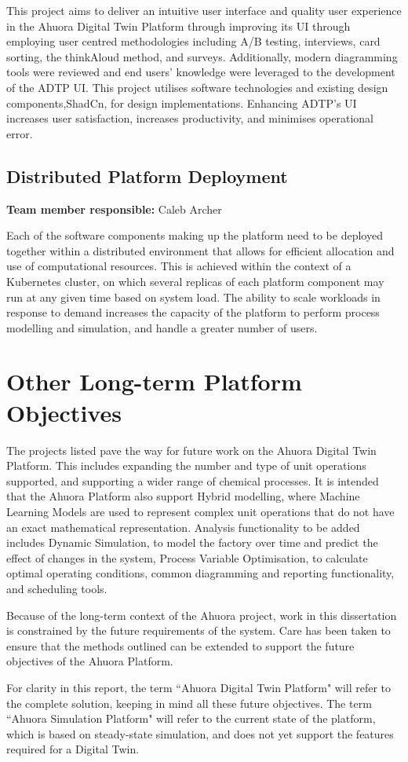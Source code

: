 This project aims to deliver an intuitive user interface and quality user experience in the Ahuora Digital Twin Platform through improving its UI through employing user centred methodologies including A/B testing, interviews, card sorting, the thinkAloud method, and surveys. Additionally, modern diagramming tools were reviewed and end users' knowledge were leveraged to the development of the ADTP UI. This project utilises software technologies and existing design components,ShadCn, for design implementations. Enhancing ADTP's UI increases user satisfaction, increases productivity, and minimises operational error.  

\subsection{Distributed Platform Deployment}

\textbf{Team member responsible:} Caleb Archer

Each of the software components making up the platform need to be deployed together within a distributed environment that allows for efficient allocation and use of computational resources. This is achieved within the context of a Kubernetes cluster, on which several replicas of each platform component may run at any given time based on system load. The ability to scale workloads in response to demand increases the capacity of the platform to perform process modelling and simulation, and handle a greater number of users.

\section{Other Long-term Platform Objectives}

The projects listed pave the way for future work on the Ahuora Digital Twin Platform. This includes expanding the number and type of unit operations supported, and supporting a wider range of chemical processes. It is intended that the Ahuora Platform also support Hybrid modelling, where Machine Learning Models are used to represent complex unit operations that do not have an exact mathematical representation. Analysis functionality to be added includes Dynamic Simulation, to model the factory over time and predict the effect of changes in the system, Process Variable Optimisation, to calculate optimal operating conditions, common diagramming and reporting functionality, and scheduling tools.

Because of the long-term context of the Ahuora project, work in this dissertation is constrained by the future requirements of the system. Care has been taken to ensure that the methods outlined can be extended to support the future objectives of the Ahuora Platform. 

For clarity in this report, the term ``Ahuora Digital Twin Platform" will refer to the complete solution, keeping in mind all these future objectives. The term ``Ahuora Simulation Platform" will refer to the current state of the platform, which is based on steady-state simulation, and does not yet support the features required for a Digital Twin.